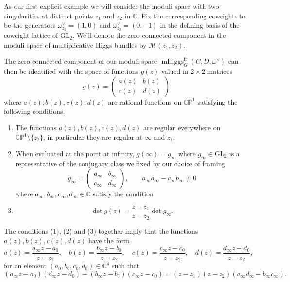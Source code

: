 \documentclass[11pt, oneside, reqno]{amsart}
\theoremstyle{definition} \newtheorem{definition}{Definition}[section]
\theoremstyle{definition} \newtheorem{remark}[definition]{Remark}
\theoremstyle{definition} \newtheorem{remarks}[definition]{Remarks}
\theoremstyle{definition} \newtheorem{question}[definition]{Question}
\theoremstyle{definition} \newtheorem*{note}{Note}
\theoremstyle{definition} \newtheorem{example}[definition]{Example}
\theoremstyle{definition} \newtheorem{examples}[definition]{Examples}
\newcommand{\bb}[1]{\mathbb{#1}}
\newcommand{\mc}[1]{\mathcal{#1}}
\newcommand{\CC}{\mathbb{C}}
\newcommand{\GL}{\mathrm{GL}}
\DeclareMathOperator{\mhiggs}{mHiggs}
\newcommand{\fr}{\mathrm{fr}}
\begin{document}
As our first explicit example we will consider the moduli space with two singularities at distinct points $z_1$ and $z_2$ in $\CC$.  Fix the corresponding coweights to be the generators $\omega^\vee_{z_1} = (1,0)$ and $\omega^\vee_{z_2} = (0,-1)$ in the defining basis of the coweight lattice of $\GL_2$.  We'll denote the zero connected component in the moduli space of multiplicative Higgs bundles by $\mc M(z_1,z_2)$.
 
The zero connected component of our moduli space  $\mhiggs_{G}^\fr(C, D, \omega^{\vee})$ can then be identified with the space of functions $g(z)$ valued in $2 \times 2$ matrices 
   \begin{equation*}
     g(z) =
     \begin{pmatrix}
       a(z) & b(z) \\
       c(z) & d(z)
     \end{pmatrix}
   \end{equation*}
   where $a(z), b(z), c(z), d(z)$ are rational functions on $\bb{CP}^1$ satisfying the following conditions. 
   \begin{enumerate}
   \item The functions $a(z), b(z), c(z), d(z)$ are regular everywhere on $\bb{CP}^1 \setminus \{z_2\}$,
     in particular they are regular at $\infty$ and $z_1$.
   \item When evaluated at the point at infinity, $g(\infty) = g_\infty$ where $g_\infty \in \GL_2$ is a representative of the conjugacy class we fixed by our choice of framing
     \begin{equation*}
       g_\infty =
       \begin{pmatrix}
         a_\infty & b_\infty \\
         c_\infty & d_\infty 
       \end{pmatrix}, \qquad a_\infty d_\infty - c_\infty b_\infty \neq 0 
     \end{equation*}
where $a_\infty, b_\infty, c_\infty, d_\infty \in \CC$  satisfy the condition
   \item
     \begin{equation*}
       \det g(z) =  \frac{ z- z_1}{ z - z_2}  \det g_\infty.
     \end{equation*}
   \end{enumerate}
 
   The conditions (1), (2) and (3) together imply that the functions $a(z), b(z), c(z), d(z)$ have the form
   \begin{equation*}
     a(z) =  \frac{a_\infty z  - a_0}{z - z_2},\quad
     b(z) = \frac{ b_\infty z  - b_0}{z - z_2},\quad
     c(z) = \frac{ c_\infty  z  - c_0}{z - z_2},\quad
     d(z) = \frac{d_\infty  z  - d_0}{z - z_2},
   \end{equation*}
for an element $(a_0, b_0, c_0, d_0) \in \CC^4$ such that
   \begin{equation*}
 (a_\infty z - a_0)( d_\infty z - d_0) -   (b_\infty z - b_0)(c_\infty z -c_0) =
     (z - z_1)(z- z_2) (a_\infty d_\infty - b_\infty c_\infty).
   \end{equation*}
\end{document}
